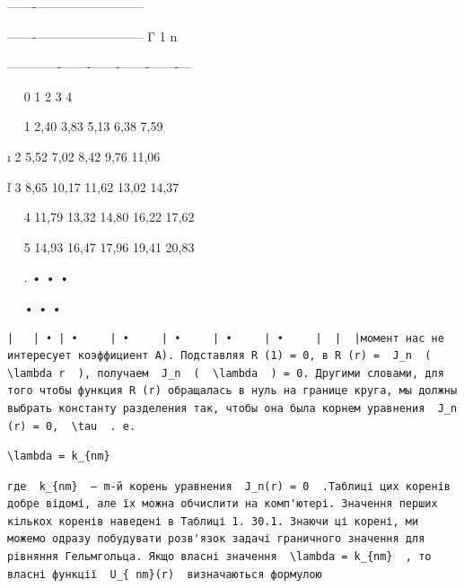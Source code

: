 \documentclass[
  ukrainian,
]{article}
\begin{document}
\textbar-------\textbar------------\textbar--------------\textbar{}

\textbar-------\textbar------------\textbar--------------\textbar\textbar{}
Γ \textbar{} 1 \textbar{} n \textbar{} \textbar{} \textbar{} \textbar{}
\textbar{} \textbar{} \textbar{}

\textbar---\textbar---\textbar-------\textbar-------\textbar-------\textbar-------\textbar-------\textbar--\textbar--\textbar{}

~~\textbar{} \textbar{} 0 \textbar{} 1 \textbar{} 2 \textbar{} 3
\textbar{} 4 \textbar{} \textbar{} \textbar{}

~~\textbar{} 1 \textbar{} 2,40 \textbar{} 3,83 \textbar{} 5,13
\textbar{} 6,38 \textbar{} 7,59 \textbar{} \textbar{} \textbar{}

ı \textbar{} 2 \textbar{} 5,52 \textbar{} 7,02 \textbar{} 8,42
\textbar{} 9,76 \textbar{} 11,06 \textbar{} \textbar{} \textbar{}

ľ \textbar{} 3 \textbar{} 8,65 \textbar{} 10,17 \textbar{} 11,62
\textbar{} 13,02 \textbar{} 14,37 \textbar{} \textbar{} \textbar{}

~~\textbar{} 4 \textbar{} 11,79 \textbar{} 13,32 \textbar{} 14,80
\textbar{} 16,22 \textbar{} 17,62 \textbar{} \textbar{} \textbar{}

~~\textbar{} 5 \textbar{} 14,93 \textbar{} 16,47 \textbar{} 17,96
\textbar{} 19,41 \textbar{} 20,83 \textbar{} \textbar{} \textbar{}

~~\textbar{} . \textbar{} • \textbar{} \textbar{} • \textbar{}
\textbar{} • \textbar{} \textbar{} \textbar{}

~~\textbar{} \textbar{} \textbar{} • \textbar{} \textbar{} • \textbar{}
• \textbar{} \textbar{} \textbar{}

\begin{verbatim}
|   | • | •     | •     | •     | •     | •     |  |  |момент нас не интересует коэффициент A). Подставляя R (1) = 0, в R (r) =  J_n  (  \lambda r  ), получаем  J_n  (  \lambda  ) = 0. Другими словами, для того чтобы функция R (r) обращалась в нуль на границе круга, мы должны выбрать константу разделения так, чтобы она была корнем уравнения  J_n  (r) = 0,  \tau  . e.
\end{verbatim}

\begin{verbatim}
\lambda = k_{nm}
\end{verbatim}

\begin{verbatim}
где  k_{nm}  — m-й корень уравнения  J_n(r) = 0  .Таблиці цих коренів добре відомі, але їх можна обчислити на комп'ютері. Значення перших кількох коренів наведені в Таблиці 1. 30.1. Знаючи ці корені, ми можемо одразу побудувати розв'язок задачі граничного значення для рівняння Гельмгольца. Якщо власні значення  \lambda = k_{nm}  , то власні функції  U_{ nm}(r)  визначаються формулою
\end{verbatim}
\end{document}
